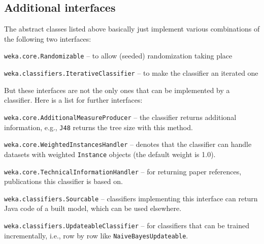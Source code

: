 \subsection{Additional interfaces}
The abstract classes listed above basically just implement various combinations
of the following two interfaces:
\begin{tight_itemize}
  \item \texttt{weka.core.Randomizable} -- to allow (seeded) randomization
taking place
  \item \texttt{weka.classifiers.IterativeClassifier} -- to make the classifier
an iterated one
\end{tight_itemize}

\newpage
\noindent But these interfaces are not the only ones that can be implemented by
a classifier. Here is a list for further interfaces:
\begin{tight_itemize}
  \item \texttt{weka.core.AdditionalMeasureProducer} -- the classifier returns
additional information, e.g., \texttt{J48} returns the tree size with this
method.
  \item \texttt{weka.core.WeightedInstancesHandler} -- denotes that the
classifier can handle datasets with weighted \texttt{Instance} objects (the
default weight is 1.0).
  \item \texttt{weka.core.TechnicalInformationHandler} -- for returning paper
references, publications this classifier is based on.
  \item \texttt{weka.classifiers.Sourcable} -- classifiers implementing this
interface can return Java code of a built model, which can be used elsewhere.
  \item \texttt{weka.classifiers.UpdateableClassifier} -- for classifiers that
can be trained incrementally, i.e., row by row like
\texttt{NaiveBayesUpdateable}.
\end{tight_itemize}

